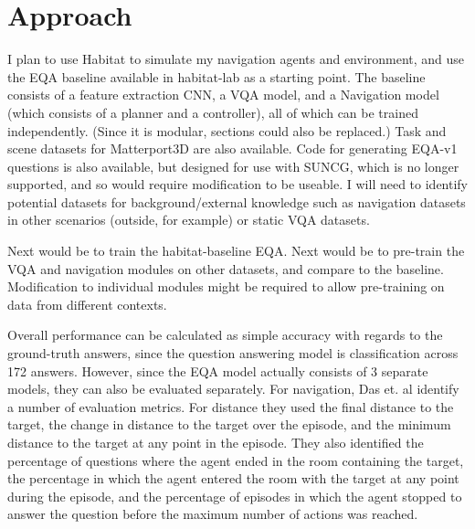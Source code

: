 \documentclass{article}
\begin{document}


\section{Approach}
I plan to use Habitat to simulate my navigation agents and environment, and use the EQA baseline available in habitat-lab as a starting point. The baseline consists of a feature extraction CNN, a VQA model, and a Navigation model (which consists of a planner and a controller), all of which can be trained independently. (Since it is modular, sections could also be replaced.) Task and scene datasets for Matterport3D are also available. Code for generating EQA-v1 questions is also available, but designed for use with SUNCG, which is no longer supported, and so would require modification to be useable\cite{embodiedqa}. I will need to identify potential datasets for background/external knowledge such as navigation datasets in other scenarios (outside, for example) or static VQA datasets. 

Next would be to train the habitat-baseline EQA. Next would be to pre-train the VQA and navigation modules on other datasets, and compare to the baseline. Modification to individual modules might be required to allow pre-training on data from different contexts. 

Overall performance can be calculated as simple accuracy with regards to the ground-truth answers, since the question answering model is classification across 172 answers. However, since the EQA model actually consists of 3 separate models, they can also be evaluated separately. For navigation, Das et. al identify a number of evaluation metrics. For distance they used the final distance to the target, the change in distance to the target over the episode, and the minimum distance to the target at any point in the episode. They also identified the percentage of questions where the agent ended in the room containing the target, the percentage in which the agent entered the room with the target at any point during the episode, and the percentage of episodes in which the agent stopped to answer the question before the maximum number of actions was reached. 
\end{document}
